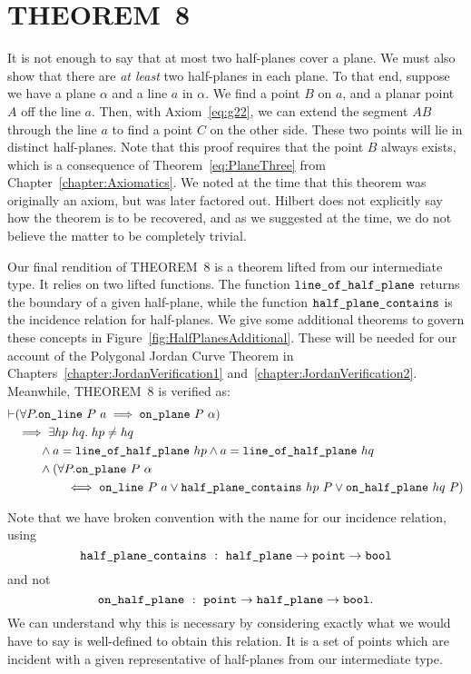 \section{THEOREM~8}
It is not enough to say that at most two half-planes cover a plane. We must also show that there are \emph{at least} two half-planes in each plane. To that end, suppose we have a plane $\alpha$ and a line $a$ in $\alpha$. We find a  point $B$ on $a$, and a planar point $A$ off the line $a$. Then, with Axiom~\ref{eq:g22}, we can extend the segment $AB$ through the line $a$ to find a point $C$ on the other side. These two points will lie in distinct half-planes. Note that this proof requires that the point $B$ always exists, which is a consequence of Theorem~\ref{eq:PlaneThree} from Chapter~\ref{chapter:Axiomatics}. We noted at the time that this theorem was originally an axiom, but was later factored out. Hilbert does not explicitly say how the theorem is to be recovered, and as we suggested at the time, we do not believe the matter to be completely trivial.

Our final rendition of THEOREM~8 is a theorem lifted from our intermediate type. It relies on two lifted functions. The function $\texttt{line\_of\_half\_plane}$ returns the boundary of a given half-plane, while the function $\texttt{half\_plane\_contains}$ is the incidence relation for half-planes. We give some additional theorems to govern these concepts in Figure~\ref{fig:HalfPlanesAdditional}. These will be needed for our account of the Polygonal Jordan Curve Theorem in Chapters~\ref{chapter:JordanVerification1} and~\ref{chapter:JordanVerification2}. Meanwhile, THEOREM~8 is verified as:
\begin{equation}\label{eq:HalfPlaneCover}
  \begin{split}
    \vdash&(\forall P. \texttt{on\_line}\ P\ a \implies \texttt{on\_plane}\ P\ \alpha)\\
    &\implies \exists hp\ hq.\; hp \neq hq\\
    &\qquad \wedge a = \texttt{line\_of\_half\_plane}\ hp \wedge a = \texttt{line\_of\_half\_plane}\ hq\\
    &\qquad \wedge (\forall P. \texttt{on\_plane}\ P\ \alpha\\
    &\qquad\qquad \iff \texttt{on\_line}\ P\ a \vee \texttt{half\_plane\_contains}\ hp\ P \vee \texttt{on\_half\_plane}\ hq\ P)
  \end{split}
\end{equation}

Note that we have broken convention with the name for our incidence relation, using 
\begin{displaymath}
\code{half\_plane\_contains}\ :\ \code{half\_plane}\rightarrow\code{point}\rightarrow\code{bool}
\end{displaymath}
and not 
\begin{displaymath}
\code{on\_half\_plane}\ :\ \code{point}\rightarrow\code{half\_plane}\rightarrow\code{bool}.
\end{displaymath}
We can understand why this is necessary by considering exactly what we would have to say is well-defined to obtain this relation. It is a set of points which are incident with a given representative of half-planes from our intermediate type. 

